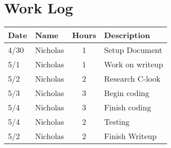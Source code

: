 \documentclass[letterpaper,10pt,fleqn,draftclsnofoot,onecolumn]{IEEEtran}
\begin{document}
	\section*{Work Log}
	\begin{tabular}{l l c p{1.1in}}\textbf{Date} & \textbf{Name} & \textbf{Hours} & \textbf{Description}\\\hline
		4/30 & Nicholas & 1 & Setup Document\\\hline
		5/1 & Nicholas & 1 & Work on writeup\\\hline
		5/2 & Nicholas & 2 & Research C-look\\\hline
		5/3 & Nicholas & 3 & Begin coding\\\hline
		5/4 & Nicholas & 3 & Finish coding\\\hline
		5/4 & Nicholas & 2 & Testing\\\hline
		5/2 & Nicholas & 2 & Finish Writeup\\\hline
	\end{tabular}
		\nocite{*}
		
		
	
\end{document}
